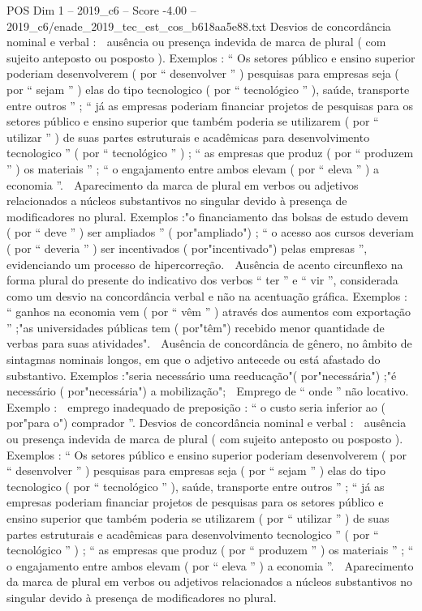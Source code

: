 \begin{textsample}{POS Dim 1 – 2019\_c6 – Score -4.00 – 2019\_c6/enade\_2019\_tec\_est\_cos\_b618aa5e88.txt}
Desvios de concordância nominal e verbal :  ausência ou presença indevida de marca de plural ( com sujeito anteposto ou posposto ).
Exemplos : “ Os setores público e ensino superior poderiam desenvolverem ( por “ desenvolver ” ) pesquisas para empresas seja ( por “ sejam ” ) elas do tipo tecnologico ( por “ tecnológico ” ), saúde, transporte entre outros ” ; “ já as empresas poderiam financiar projetos de pesquisas para os setores público e ensino superior que também poderia se utilizarem ( por “ utilizar ” ) de suas partes estruturais e acadêmicas para desenvolvimento tecnologico ” ( por “ tecnológico ” ) ; “ as empresas que produz ( por “ produzem ” ) os materiais ” ; “ o engajamento entre ambos elevam ( por “ eleva ” ) a economia ”.  Aparecimento da marca de plural em verbos ou adjetivos relacionados a núcleos substantivos no singular devido à presença de modificadores no plural.
Exemplos :"o financiamento das bolsas de estudo devem ( por “ deve ” ) ser ampliados ” ( por"ampliado") ; “ o acesso aos cursos deveriam ( por “ deveria ” ) ser incentivados ( por"incentivado") pelas empresas ”, evidenciando um processo de hipercorreção.  Ausência de acento circunflexo na forma plural do presente do indicativo dos verbos “ ter ” e “ vir ”, considerada como um desvio na concordância verbal e não na acentuação gráfica.
Exemplos : “ ganhos na economia vem ( por “ vêm ” ) através dos aumentos com exportação ” ;"as universidades públicas tem ( por"têm") recebido menor quantidade de verbas para suas atividades".  Ausência de concordância de gênero, no âmbito de sintagmas nominais longos, em que o adjetivo antecede ou está afastado do substantivo.
Exemplos :"seria necessário uma reeducação"( por"necessária") ;"é necessário ( por"necessária") a mobilização";  Emprego de “ onde ” não locativo.
Exemplo :  emprego inadequado de preposição : “ o custo seria inferior ao ( por"para o") comprador ”.
Desvios de concordância nominal e verbal :  ausência ou presença indevida de marca de plural ( com sujeito anteposto ou posposto ).
Exemplos : “ Os setores público e ensino superior poderiam desenvolverem ( por “ desenvolver ” ) pesquisas para empresas seja ( por “ sejam ” ) elas do tipo tecnologico ( por “ tecnológico ” ), saúde, transporte entre outros ” ; “ já as empresas poderiam financiar projetos de pesquisas para os setores público e ensino superior que também poderia se utilizarem ( por “ utilizar ” ) de suas partes estruturais e acadêmicas para desenvolvimento tecnologico ” ( por “ tecnológico ” ) ; “ as empresas que produz ( por “ produzem ” ) os materiais ” ; “ o engajamento entre ambos elevam ( por “ eleva ” ) a economia ”.  Aparecimento da marca de plural em verbos ou adjetivos relacionados a núcleos substantivos no singular devido à presença de modificadores no plural.

\end{textsample}
